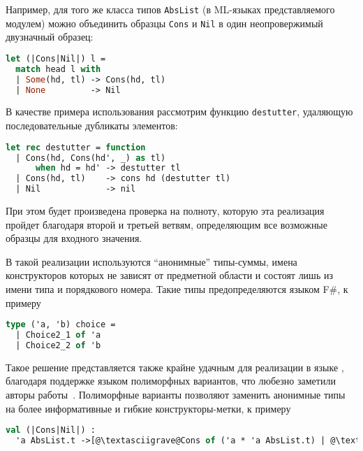 Например, для того же класса типов \lstinline|AbsList| (в ML-языках представляемого модулем) можно объединить образцы \lstinline|Cons| и \lstinline|Nil| в один неопровержимый двузначный образец:

\noindent
\begin{minipage}{\linewidth}
\begin{lstlisting}[language=ocaml]
let (|Cons|Nil|) l =
  match head l with
  | Some(hd, tl) -> Cons(hd, tl)
  | None         -> Nil
\end{lstlisting}
\end{minipage}

В качестве примера использования рассмотрим функцию \lstinline|destutter|, удаляющую последовательные дубликаты элементов: 

\noindent
\begin{minipage}{\linewidth}
\begin{lstlisting}[language=ocaml]
let rec destutter = function
  | Cons(hd, Cons(hd', _) as tl) 
      when hd = hd' -> destutter tl
  | Cons(hd, tl)    -> cons hd (destutter tl)
  | Nil             -> nil
\end{lstlisting}
\end{minipage}

При этом будет произведена проверка на полноту, которую эта реализация пройдет благодаря второй и третьей ветвям, определяющим все возможные образцы для входного значения.

В такой реализации используются ``анонимные'' типы-суммы, имена конструкторов которых не зависят от предметной области и состоят лишь из имени типа и порядкового номера. Такие типы предопределяются языком F\#, к примеру

\noindent
\begin{minipage}{\linewidth}
\begin{lstlisting}[language=ocaml]
type ('a, 'b) choice =
  | Choice2_1 of 'a
  | Choice2_2 of 'b
\end{lstlisting}
\end{minipage}

Такое решение представляется также крайне удачным для реализации в языке \ocaml, благодаря поддержке языком полиморфных вариантов, что любезно заметили авторы работы~\cite{syme2007extensible}. Полиморфные варианты позволяют заменить анонимные типы на более информативные и гибкие конструкторы-метки, к примеру

\noindent
\begin{minipage}{\linewidth}
\begin{lstlisting}[language=ocaml,escapechar=@]
val (|Cons|Nil|) : 
  'a AbsList.t ->[@\textasciigrave@Cons of ('a * 'a AbsList.t) | @\textasciigrave@Nil]
\end{lstlisting}
\end{minipage}

